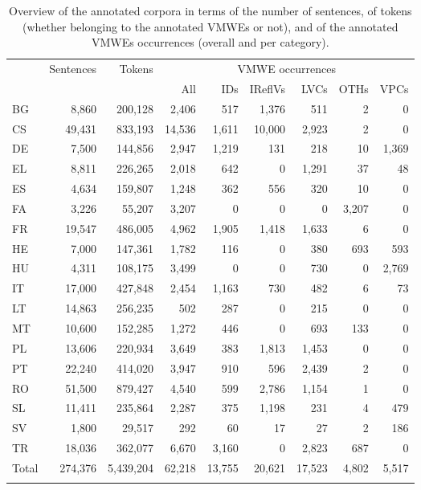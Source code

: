 \documentclass[output=paper,modfonts]{langscibook}
\begin{document}
\begin{table}[t]
\centering
\setlength{\tabcolsep}{0.9mm}

\begin{tabularx}{.95\textwidth}{lrrrrrrrr}
\lsptoprule
\multirow{2}{*}{Language} & \multirow{2}{*}{Sentences} & \multirow{2}{*}{Tokens} & \multicolumn{6}{c}{VMWE occurrences} \\\cmidrule{4-9}
& & & All & IDs & IReflVs & LVCs & OTHs & VPCs \\
\midrule
BG & 8,860 & 200,128 & 2,406 & 517 & 1,376 & 511 & 2 & 0 \\
CS & 49,431 & 833,193 & 14,536 & 1,611 & 10,000 & 2,923 & 2 & 0 \\
DE & 7,500 & 144,856 & 2,947 & 1,219 & 131 & 218 & 10 & 1,369 \\
EL & 8,811 & 226,265 & 2,018 & 642 & 0 & 1,291 & 37 & 48 \\
ES & 4,634 & 159,807 & 1,248 & 362 & 556 & 320 & 10 & 0 \\
FA & 3,226 & 55,207 & 3,207 & 0 & 0 & 0 & 3,207 & 0 \\
FR & 19,547 & 486,005 & 4,962 & 1,905 & 1,418 & 1,633 & 6 & 0 \\
HE & 7,000 & 147,361 & 1,782 & 116 & 0 & 380 & 693 & 593 \\
HU & 4,311 & 108,175 & 3,499 & 0 & 0 & 730 & 0 & 2,769 \\
IT & 17,000 & 427,848 & 2,454 & 1,163 & 730 & 482  & 6 & 73 \\
LT & 14,863 & 256,235 & 502 & 287 & 0 & 215 & 0 & 0 \\
MT & 10,600 & 152,285 & 1,272 & 446 & 0 & 693 & 133 & 0 \\
PL & 13,606 & 220,934 & 3,649 & 383 & 1,813 & 1,453 & 0 & 0 \\
PT & 22,240 & 414,020 & 3,947 & 910 & 596 & 2,439  & 2 & 0 \\
RO & 51,500 & 879,427 & 4,540 & 599 & 2,786 & 1,154 & 1 & 0 \\
SL & 11,411 & 235,864 & 2,287 & 375 & 1,198 & 231 & 4 & 479 \\
SV & 1,800 & 29,517 & 292 & 60 & 17 & 27 & 2 & 186 \\
TR & 18,036 & 362,077 & 6,670 & 3,160 & 0 & 2,823 & 687 & 0 \\
\midrule
Total & 274,376 & 5,439,204 & 62,218 & 13,755 & 20,621 & 17,523 & 4,802 & 5,517 \\
\lspbottomrule       
\end{tabularx}
\caption{Overview of the annotated corpora in terms of the number of sentences, of tokens (whether belonging to the annotated VMWEs or not), and of the annotated VMWEs occurrences (overall and per category).}\label{tab:corpora-overview}
\end{table}
\end{document}
